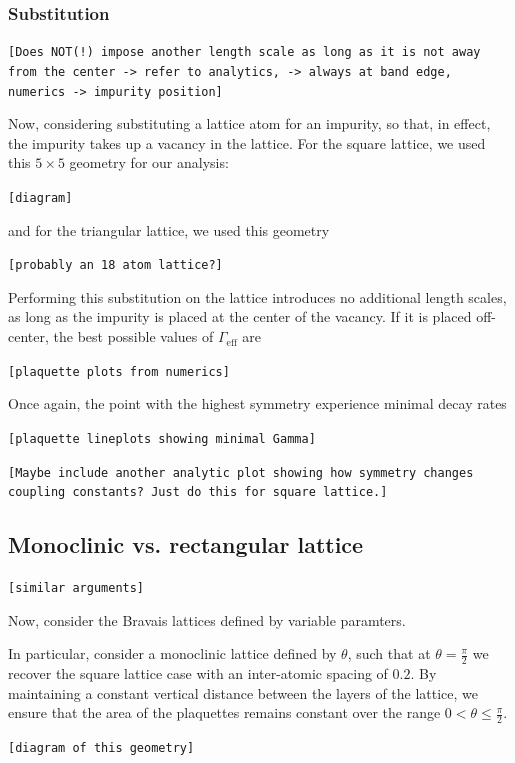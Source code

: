 \documentclass[aps,pra,superscriptaddress,twocolumn]{revtex4-1}
\newcommand{\commentSB}[1]{\texttt{\color{blue}[#1]}}
\newcommand{\commentSO}[1]{\texttt{\color{orange}[#1]}}
\begin{document}
\subsubsection{Substitution}
\commentSO{Does NOT(!) impose another length scale as long as it is not away from the center -> refer to analytics, -> always at band edge, numerics -> impurity position}

Now, considering substituting a lattice atom for an impurity, so that, in effect, the impurity takes up a vacancy in the lattice. For the square lattice, we used this $5 \times 5$ geometry for our analysis:

\commentSB{diagram}

and for the triangular lattice, we used this geometry

\commentSB{probably an 18 atom lattice?}

Performing this substitution on the lattice introduces no additional length scales, as long as the impurity is placed at the center of the vacancy. If it is placed off-center, the best possible values of $\Gamma_\text{eff}$ are 

\commentSB{plaquette plots from numerics}

Once again, the point with the highest symmetry experience  minimal decay rates

\commentSB{plaquette lineplots showing minimal Gamma}

\commentSB{Maybe include another analytic plot showing how symmetry changes coupling constants? Just do this for square lattice.}

\subsection{Monoclinic vs. rectangular lattice}
\commentSO{similar arguments}

Now, consider the Bravais lattices defined by variable paramters. 

In particular, consider a monoclinic lattice defined by $\theta$, such that at $\theta = \frac{\pi}{2}$ we recover the square lattice case with an inter-atomic spacing of $0.2$. By maintaining a constant vertical distance between the layers of the lattice, we ensure that the area of the plaquettes remains constant over the range $ 0 < \theta \leq \frac{\pi}{2}$. 

\commentSB{diagram of this geometry}
\end{document}
